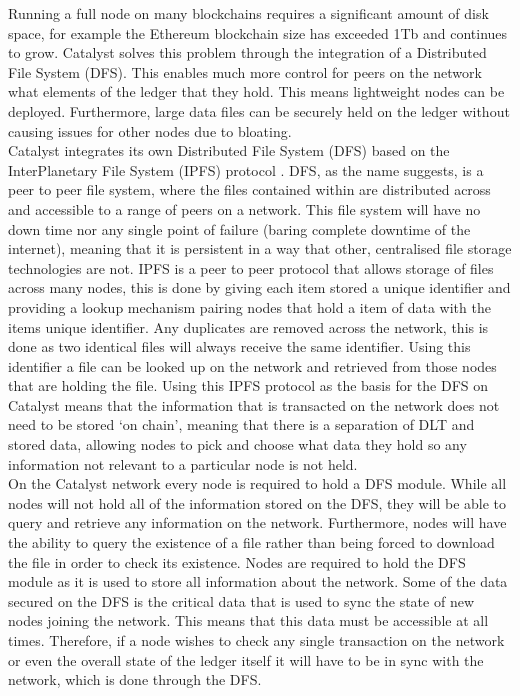 Running a full node on many blockchains requires a significant amount of disk space, for example the Ethereum blockchain size has exceeded 1Tb \cite{EthBloat} and continues to grow. Catalyst solves this problem through the integration of a Distributed File System (DFS). This enables much more control for peers on the network what elements of the ledger that they hold. This means lightweight nodes can be deployed. Furthermore, large data files can be securely held on the ledger without causing issues for other nodes due to bloating. \\

Catalyst integrates its own Distributed File System (DFS) \cite{DFS} based on the InterPlanetary File System (IPFS) protocol \cite{benet2014ipfs}. DFS, as the name suggests, is a peer to peer file system, where the files contained within are distributed across and accessible to a range of peers on a network. This file system will have no down time nor any single point of failure (baring complete downtime of the internet), meaning that it is persistent in a way that other, centralised file storage technologies are not. IPFS is a peer to peer protocol that allows storage of files across many nodes, this is done by giving each item stored a unique identifier and providing a lookup mechanism pairing nodes that hold a item of data with the items unique identifier. Any duplicates are removed across the network, this is done as two identical files will always receive the same identifier. Using this identifier a file can be looked up on the network and retrieved from those nodes that are holding the file. Using this IPFS protocol as the basis for the DFS on Catalyst means that the information that is transacted on the network does not need to be stored `on chain', meaning that there is a separation of DLT and stored data, allowing nodes to pick and choose what data they hold so any information not relevant to a particular node is not held. \\ %

On the Catalyst network every node is required to hold a DFS module. While all nodes will not hold all of the information stored on the DFS, they will be able to query and retrieve any information on the network. Furthermore, nodes will have the ability to query the existence of a file rather than being forced to download the file in order to check its existence. Nodes are required to hold the DFS module as it is used to store all information about the network.  Some of the data secured on the DFS is the critical data that is used to sync the state of new nodes joining the network. This means that this data must be accessible at all times. Therefore, if a node wishes to check any single transaction on the network or even the overall state of the ledger itself it will have to be in sync with the network, which is done through the DFS.  \\ %

